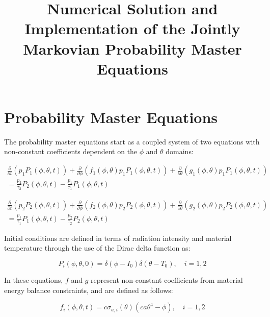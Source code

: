 \documentclass[12pt,a4paper,pagesize=pdftex]{scrartcl}
\title{Numerical Solution and Implementation of the Jointly Markovian Probability Master Equations}
\subtitle{}
\author{}
\date{}
\begin{document}
\pdfpageheight 11in
\pdfpagewidth 8.5in

\maketitle

\section*{Probability Master Equations}
The probability master equations start as a coupled system of two equations with non-constant coefficients dependent on the \(\phi\) and \(\theta\) domains:

\begin{multline*}
    \frac{\partial}{\partial t} \left(p_1 P_1 \left(\phi, \theta, t\right)\right) + \frac{\partial}{\partial \phi} \left(f_1\left(\phi, \theta\right) p_1 P_1 \left(\phi, \theta, t\right)\right) + \frac{\partial}{\partial \theta} \left(g_1 \left(\phi, \theta\right) p_1 P_1\left(\phi, \theta, t\right)\right) \\= \frac{p_2}{\tau_2} P_2 \left(\phi, \theta, t\right) - \frac{p_1}{\tau_1} P_1\left(\phi, \theta, t\right)
\end{multline*}

\begin{multline*}
    \frac{\partial}{\partial t} \left(p_2 P_2 \left(\phi, \theta, t\right) \right) + \frac{\partial}{\partial \phi} \left(f_2 \left(\phi, \theta\right) p_2 P_2 \left(\phi, \theta, t\right)\right) + \frac{\partial}{\partial \theta} \left(g_2 \left(\phi, \theta\right) p_2 P_2\left(\phi, \theta, t\right)\right) \\= \frac{p_1}{\tau_1} P_1\left(\phi, \theta, t\right) - \frac{p_2}{\tau_2} P_2\left(\phi, \theta, t\right)
\end{multline*}

Initial conditions are defined in terms of radiation intensity and material temperature through the use of the Dirac delta function as:

\begin{equation*}
    P_i\left(\phi, \theta, 0\right) = \delta\left(\phi - I_0\right) \delta\left(\theta - T_0\right), \quad i = 1, 2
\end{equation*}

In these equations, \(f\) and \(g\) represent non-constant coefficients from material energy balance constraints, and are defined as follows:

\begin{equation*}
    f_i\left(\phi, \theta, t\right) = c \sigma_{a,i}\left(\theta\right) \left(c a \theta^4 - \phi\right), \quad i = 1, 2
\end{equation*}
\end{document}
